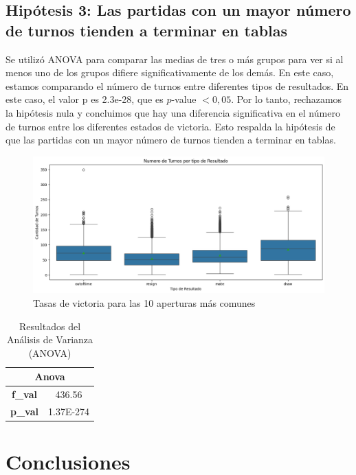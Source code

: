 \documentclass[a4paper, 12pt]{article}
\begin{document}
\newpage

\subsection{Hipótesis 3: Las partidas con un mayor número de turnos tienden a terminar en tablas}
Se utilizó ANOVA para comparar las medias de tres o más grupos para ver si al menos uno de los grupos difiere significativamente de los demás. En este caso, estamos comparando el número de turnos entre diferentes tipos de resultados.
En este caso, el valor p es 2.3e-28, que es $p$-value $< 0{,}05$. 
Por lo tanto, rechazamos la hipótesis nula y concluimos que hay una diferencia significativa en el número de turnos entre los diferentes estados de victoria. Esto respalda la hipótesis de que las partidas con un mayor número de turnos tienden a terminar en tablas.

\begin{figure}[H]
    \centering
    \includegraphics[width=\textwidth]{../Imagenes/Hipotesis_3.png}
    \caption{Tasas de victoria para las 10 aperturas más comunes}
    \label{fig:opening_win_rates}
\end{figure}


\begin{table}[h!]
    \centering
    \begin{tabular}{|c|c|}
        \hline
        \multicolumn{2}{|c|}{\textbf{Anova}} \\ \hline
        \textbf{f\_val} & 436.56 \\ \hline
        \textbf{p\_val} & 1.37E-274 \\ \hline
    \end{tabular}
    \caption{Resultados del Análisis de Varianza (ANOVA)}
    \label{table:anova}
\end{table}


\newpage

\section{Conclusiones}
\end{document}
